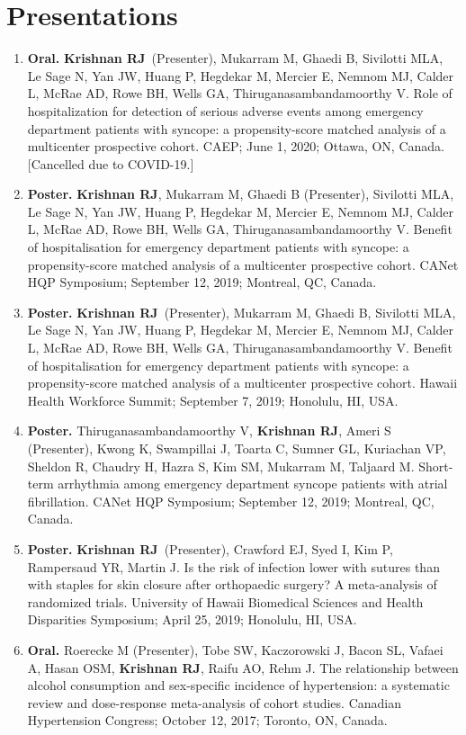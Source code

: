\documentclass[10.5pt,letterpaper]{article}
\newcommand{\myname}{\textbf{Krishnan RJ}}
\begin{document}
\section{Presentations}
\begin{enumerate}
\item \textbf{Oral.} \myname\ (Presenter), Mukarram M, Ghaedi B, Sivilotti MLA, Le Sage N, Yan JW, Huang P, Hegdekar M, Mercier E, Nemnom MJ, Calder L, McRae AD, Rowe BH, Wells GA, Thiruganasambandamoorthy V. Role of hospitalization for detection of serious adverse events among emergency department patients with syncope: a propensity-score matched analysis of a multicenter prospective cohort. CAEP; June 1, 2020; Ottawa, ON, Canada. [Cancelled due to COVID-19.]
\item \textbf{Poster.} \myname, Mukarram M, Ghaedi B (Presenter), Sivilotti MLA, Le Sage N, Yan JW, Huang P, Hegdekar M, Mercier E, Nemnom MJ, Calder L, McRae AD, Rowe BH, Wells GA, Thiruganasambandamoorthy V. Benefit of hospitalisation for emergency department patients with syncope: a propensity-score matched analysis of a multicenter prospective cohort. CANet HQP Symposium; September 12, 2019; Montreal, QC, Canada.
\item \textbf{Poster.} \myname\ (Presenter), Mukarram M, Ghaedi B, Sivilotti MLA, Le Sage N, Yan JW, Huang P, Hegdekar M, Mercier E, Nemnom MJ, Calder L, McRae AD, Rowe BH, Wells GA, Thiruganasambandamoorthy V. Benefit of hospitalisation for emergency department patients with syncope: a propensity-score matched analysis of a multicenter prospective cohort. Hawaii Health Workforce Summit; September 7, 2019; Honolulu, HI, USA.
\item \textbf{Poster.} Thiruganasambandamoorthy V, \myname, Ameri S (Presenter), Kwong K, Swampillai J, Toarta C, Sumner GL, Kuriachan VP, Sheldon R, Chaudry H, Hazra S, Kim SM, Mukarram M, Taljaard M. Short-term arrhythmia among emergency department syncope patients with atrial fibrillation. CANet HQP Symposium; September 12, 2019; Montreal, QC, Canada.
\item \textbf{Poster.} \myname\ (Presenter), Crawford EJ, Syed I, Kim P, Rampersaud YR, Martin J. Is the risk of infection lower with sutures than with staples for skin closure after orthopaedic surgery? A meta-analysis of randomized trials. University of Hawaii Biomedical Sciences and Health Disparities Symposium; April 25, 2019; Honolulu, HI, USA.
\item \textbf{Oral.} Roerecke M (Presenter), Tobe SW, Kaczorowski J, Bacon SL, Vafaei A, Hasan OSM, \myname, Raifu AO, Rehm J. The relationship between alcohol consumption and sex-specific incidence of hypertension: a systematic review and dose-response meta-analysis of cohort studies. Canadian Hypertension Congress; October 12, 2017; Toronto, ON, Canada.

\end{enumerate}
\end{document}
